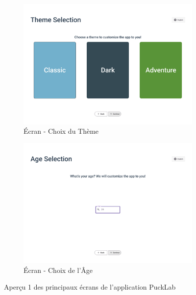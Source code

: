 \begin{figure}[H]
    \centering

    \begin{subfigure}{0.45\linewidth}
        \centering
        \includegraphics[width=\linewidth]{figures//Theme Choice.png}
        \caption{\label{fig:choice_theme} Écran - Choix du Thème}
    \end{subfigure}
    \hfill
    \begin{subfigure}{0.45\linewidth}
        \centering
        \includegraphics[width=\linewidth]{figures//Age Choice.png}
        \caption{\label{fig:choice_age} Écran - Choix de l'Âge}
    \end{subfigure}


    \caption{Aperçu 1 des principaux écrans de l'application PuckLab}
    \label{fig:ui_screens-1}
\end{figure}


